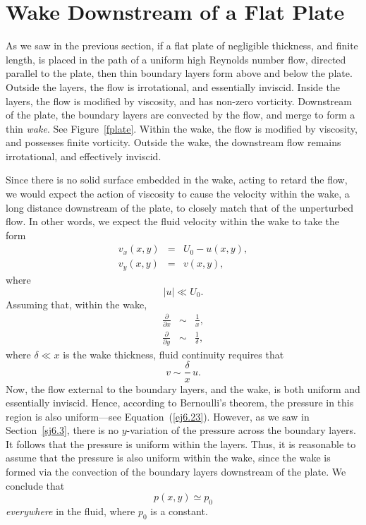 \section{Wake Downstream of a Flat Plate}\label{swake}
As we saw in the previous section, if a flat plate of negligible thickness, and finite length, is placed in the path of a uniform high Reynolds number
flow, directed parallel to the plate, then  thin boundary layers form above and below the plate. Outside the
layers, the flow is irrotational, and essentially inviscid. Inside the layers, the flow is modified by viscosity,
and has non-zero vorticity. Downstream of the plate, the boundary layers are convected by the flow, and merge to form a thin {\em wake}. See
Figure~\ref{fplate}. 
Within the wake, the flow is modified by viscosity, and possesses finite vorticity. Outside the wake, the downstream flow 
remains irrotational, and effectively inviscid. 

Since there is no solid surface embedded in the wake, acting to retard the flow, we would
expect the action of viscosity to cause the velocity within the wake, a long distance downstream of the plate, to closely match that of
the unperturbed flow. In other words, we expect the fluid velocity within the wake to take the form 
\begin{eqnarray}
v_x(x,y) &=& U_0 - u(x,y),\label{ej6.84}\\[0.5ex]
v_y(x,y) &=& v(x,y),
\end{eqnarray}
where 
\begin{equation}
|u|\ll U_0.
\end{equation} 
Assuming that, within the wake, 
\begin{eqnarray}
\frac{\partial}{\partial x}&\sim &\frac{1}{x},\\[0.5ex]
\frac{\partial}{\partial y}&\sim &\frac{1}{\delta},
\end{eqnarray}
where $\delta\ll x$ is the wake thickness, fluid continuity requires that
\begin{equation}
v\sim \frac{\delta}{x}\,u.\label{ej6.85}
\end{equation}
Now, the flow external to  the boundary layers, and the wake, is  both uniform and essentially inviscid. Hence, according to Bernoulli's theorem, the pressure in this region is also uniform---see Equation~(\ref{ej6.23}). However, as we saw in Section~\ref{sj6.3},  there is no $y$-variation of the pressure  across the boundary layers.
It follows that the pressure is  uniform within the layers.
Thus, it is reasonable to assume that the pressure is also uniform within the wake, since the wake is formed via 
the   convection of the boundary layers downstream of the plate. We conclude 
that
\begin{equation}
p(x,y)\simeq p_0\label{ej6.86}
\end{equation}
{\em everywhere}\/ in the fluid, where $p_0$ is a constant. 

